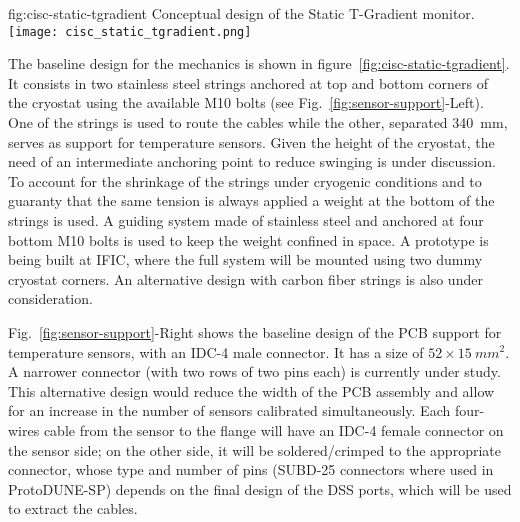 \begin{dunefigure}
{fig:cisc-static-tgradient}
  {Conceptual design of the Static T-Gradient monitor.}
  \texttt{[image: cisc\_static\_tgradient.png]}
\end{dunefigure}

The baseline design for the mechanics 
is shown in figure~\ref{fig:cisc-static-tgradient}. It consists in two stainless steel strings anchored at top and bottom corners of the cryostat
using the available M10 bolts (see Fig.~\ref{fig:sensor-support}-Left). One of the strings is used to route the cables while the other,
separated \SI{340}{mm}, serves as support for temperature sensors.
Given the height of the cryostat, the need of an intermediate anchoring point to reduce swinging is under discussion. To account for the shrinkage of the strings under cryogenic conditions and to guaranty that the same tension is always applied a weight at the bottom of the strings is used. A guiding system made of stainless steel and anchored at four bottom M10 bolts is used to keep the weight confined in space. A prototype is being built at IFIC, where the full system will be mounted using two dummy cryostat corners. An alternative design with carbon fiber strings is also under consideration.  


Fig.~\ref{fig:sensor-support}-Right shows the baseline design of the
PCB support for temperature sensors, with an IDC-4 male connector. 
It has a size of $52\times \SI{15}{mm^2}$. A narrower connector (with two rows of two pins each) is currently under study. This alternative design would reduce the width of the PCB assembly and allow for an increase in the number of sensors calibrated simultaneously. Each four-wires cable from the sensor to the flange will have an IDC-4 female connector on the sensor side; on the other side, it will be soldered/crimped to the appropriate connector, whose type and number of pins (SUBD-25 connectors where used in ProtoDUNE-SP) depends on the final design of the DSS ports,
which will be used to extract the cables. 

